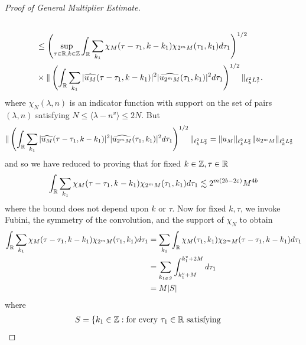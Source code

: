 \begin{proof}[Proof of General Multiplier Estimate]
\begin{equation*}
\begin{split}
\\
& \le \left ( \sup_{\tau \in \mathbb{R}, k \in \mathbb{Z}} \int_{\mathbb{R}} \sum_{k_{1}}
\chi_{M}(\tau - \tau_{1}, k - k_{1}) \chi_{2^{m}M}(\tau_{1}, k_{1}) d \tau_{1} \right )^{1/2}  
\\
& \times \| \left( \int_{\mathbb{R}} \sum_{k_{1}} | \widehat{u_{M}}(\tau - \tau_{1}, k - k_{1}) |^{2} | \widehat{u_{2^{m}M}}(\tau_{1}, k_{1}) |^{2} d \tau_{1} \right)^{1/2} \|_{\ell^{2}_{k} L^{2}_{\tau}}. 
\end{split}
\end{equation*}
%
%
where $\chi_{N}(\lambda, n)$ is an indicator function with support on the set of pairs $(\lambda, n)$ satisfying $N \le \langle \lambda - n^{v} \rangle  \le 2N$.  But
%
%
\begin{equation*}
\begin{split}
  \| \left( \int_{\mathbb{R}} \sum_{k_{1}} | \widehat{u_{M}}(\tau - \tau_{1}, k - k_{1}) |^{2} | \widehat{u_{2^{m}M}}(\tau_{1}, k_{1}) |^{2} d \tau_{1} \right)^{1/2} \|_{\ell^{2}_{k}L^{2}_{\tau}} 
  & = \| u_{M} \|_{\ell^{2}_{k}L^{2}_{\tau}} \| u_{2^{m} M} \|_{\ell^{2}_{k}L^{2}_{\tau}} 
\end{split}
\end{equation*}
%
%
and so we have reduced to proving that for fixed $k \in \mathbb{Z}, \tau \in \mathbb{R}$
%
%
\begin{equation*}
\begin{split}
\int_{\mathbb{R}} \sum_{k_{1}}
\chi_{M}(\tau - \tau_{1}, k - k_{1}) \chi_{2^{m}M}(\tau_{1}, k_{1}) d \tau_{1}  \lesssim 2^{m(2b - 2 \varepsilon)} M^{4b}
\end{split}
\end{equation*}
%
%
where the bound does not depend upon $k$ or $\tau$. Now for fixed $k, \tau$, we invoke Fubini, the symmetry of the convolution, and the support of $\chi_{N}$ to obtain
%
%
\begin{equation*}
\begin{split}
\int_{\mathbb{R}} \sum_{k_{1}}
\chi_{M}(\tau - \tau_{1}, k - k_{1}) \chi_{2^{m}M}(\tau_{1}, k_{1}) d \tau_{1}  
& = 
\sum_{k_{1}}\int_{\mathbb{R}} 
\chi_{M}(\tau_{1}, k_{1}) \chi_{2^{m}M}(\tau - \tau_{1}, k - k_{1}) d \tau_{1} 
\\
& = \sum_{k_{1 \in S}} \int_{k_{1}^{v} + M}^{k_{1}^{v} + 2M} d \tau_{1}
\\
& = M | S |
\end{split}
\end{equation*}
%
%
where
%
%
\begin{equation*}
\begin{split}
  S =  \{ & k_{1} \in \zz: \text{for every} \ \tau_{1} \in \rr \ \text{satisfying} \ 

\end{split}
\end{equation*}
\end{proof}
